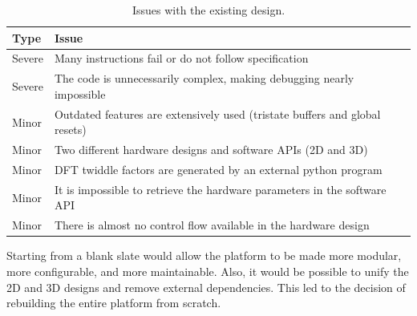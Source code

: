 \begin{table}[!ht]
    \renewcommand{\arraystretch}{1.3}
    \centering
    \begin{tabular}{l|l}
        \bfseries Type & \bfseries Issue \\
        \hline
        Severe & Many instructions fail or do not follow specification \\
        Severe & The code is unnecessarily complex, making debugging nearly impossible \\
        Minor & Outdated features are extensively used (tristate buffers and global resets) \\
        Minor & Two different hardware designs and software APIs (2D and 3D) \\
        Minor & DFT twiddle factors are generated by an external python program \\
        Minor & It is impossible to retrieve the hardware parameters in the software API \\
        Minor & There is almost no control flow available in the hardware design \\
    \end{tabular}
    \caption[Issues]{Issues with the existing design.}
    \label{tab:issues}
\end{table}

Starting from a blank slate would allow the platform to be made more modular, more configurable, and more maintainable.
Also, it would be possible to unify the 2D and 3D designs and remove external dependencies.
This led to the decision of rebuilding the entire platform from scratch.
